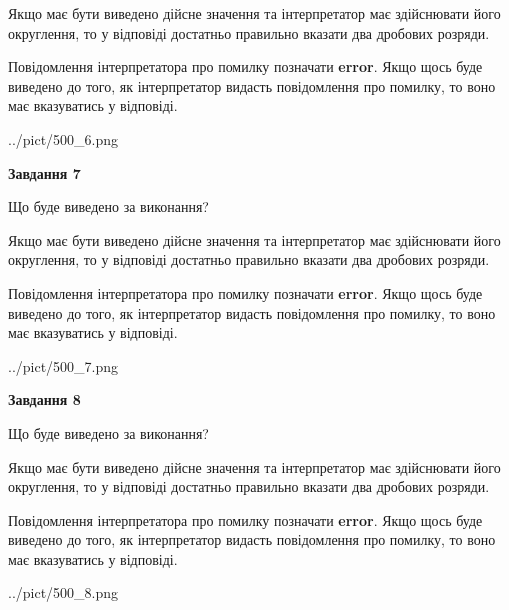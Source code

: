 \documentclass[12pt, ukrainian]{article}
\begin{document}
{\begin {Large}
Якщо має бути виведено дійсне значення та інтерпретатор має здійснювати його округлення, 
то у відповіді достатньо правильно вказати два дробових розряди.

Повідомлення інтерпретатора про помилку позначати \textbf{error}.
Якщо щось буде виведено до того, як інтерпретатор видасть повідомлення про помилку, 
то воно має вказуватись у відповіді. \par

\begin{center}
	{../pict/500_6.png}
\end{center}
\newpage

{\begin {center}\textbf{Завдання 7}\end {center}}\par
Що буде виведено за виконання? \par

Якщо має бути виведено дійсне значення та інтерпретатор має здійснювати його округлення, 
то у відповіді достатньо правильно вказати два дробових розряди.

Повідомлення інтерпретатора про помилку позначати \textbf{error}.
Якщо щось буде виведено до того, як інтерпретатор видасть повідомлення про помилку, 
то воно має вказуватись у відповіді. \par

\begin{center}
	{../pict/500_7.png}
\end{center}
\newpage

{\begin {center}\textbf{Завдання 8}\end {center}}\par
Що буде виведено за виконання? \par

Якщо має бути виведено дійсне значення та інтерпретатор має здійснювати його округлення, 
то у відповіді достатньо правильно вказати два дробових розряди.

Повідомлення інтерпретатора про помилку позначати \textbf{error}.
Якщо щось буде виведено до того, як інтерпретатор видасть повідомлення про помилку, 
то воно має вказуватись у відповіді. \par

\begin{center}
	{../pict/500_8.png}
\end{center}
\newpage


\end{Large}}
\end{document}
